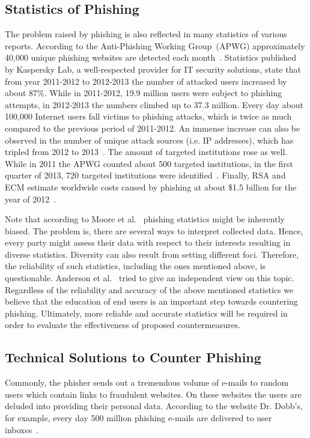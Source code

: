 \subsection{Statistics of Phishing}
\label{s:stats}
The problem raised by phishing is also reflected in many statistics of various reports. 
 According to the Anti-Phishing Working Group~(APWG) approximately 40,000 unique phishing websites are detected each month~\cite{antiphishingtrendreport2013}. Statistics published by Kaspersky Lab, a well-respected provider for IT security solutions, state that from year 2011-2012 to 2012-2013 the number of attacked users increased by about 87\%. 
While in 2011-2012, 19.9 million users were subject to phishing attempts, in 2012-2013 the numbers climbed up to 37.3 million. 
 Every day about 100,000 Internet users fall victims to phishing attacks, which is twice as much compared to the previous period of 2011-2012. An immense increase can also be observed in the number of unique attack sources (i.e. IP addresses), which has tripled from 2012 to 2013~\cite{kasperskyreport2013}. The amount of targeted institutions rose as well. 
 While in 2011 the APWG counted about 500 targeted institutions, in the first quarter of 2013, 720 targeted institutions were identified~\cite{antiphishingglobalreport2013}. 
Finally, RSA and ECM estimate worldwide costs caused by phishing at about \$1.5 billion for the year of 2012~\cite{rsa2013}. 

Note that according to Moore et al.~\cite{moore2010hard} phishing statistics might be inherently biased. 
The problem is, there are several ways to interpret collected data. 
Hence, every party might assess their data with respect to their interests resulting in diverse statistics. 
Diversity can also result from setting different foci.
Therefore, the reliability of such statistics, including the ones mentioned above, is questionable. 
Anderson et al.~\cite{anderson2012measuring} tried to give an independent view on this topic.
Regardless of the reliability and accuracy of the above mentioned statistics we believe that the education of end users is an important step towards countering phishing. 
Ultimately, more reliable and accurate statistics will be required in order to evaluate the effectiveness of proposed countermeasures. 

\subsection{Technical Solutions to Counter Phishing}
\label{s:technical_solutions}
Commonly, the phisher sends out a tremendous volume of e-mails to random users which contain links to fraudulent websites.
 On these websites the users are deluded into providing their personal data.
According to the website Dr. Dobb's, for example, every day 500 million phishing e-mails are delivered to user inboxes~\cite{drdobb2012email}.


